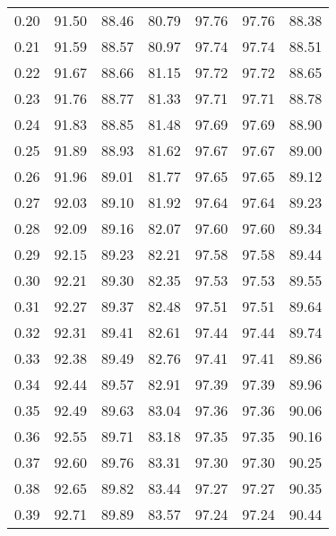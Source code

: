 \begin{tabular}{|c|c|c|c|c|c|c|}
      0.20 &     91.50 &     88.46 &      80.79 &   97.76 &      97.76 &         88.38 \\
      0.21 &     91.59 &     88.57 &      80.97 &   97.74 &      97.74 &         88.51 \\
      0.22 &     91.67 &     88.66 &      81.15 &   97.72 &      97.72 &         88.65 \\
      0.23 &     91.76 &     88.77 &      81.33 &   97.71 &      97.71 &         88.78 \\
      0.24 &     91.83 &     88.85 &      81.48 &   97.69 &      97.69 &         88.90 \\
      0.25 &     91.89 &     88.93 &      81.62 &   97.67 &      97.67 &         89.00 \\
      0.26 &     91.96 &     89.01 &      81.77 &   97.65 &      97.65 &         89.12 \\
      0.27 &     92.03 &     89.10 &      81.92 &   97.64 &      97.64 &         89.23 \\
      0.28 &     92.09 &     89.16 &      82.07 &   97.60 &      97.60 &         89.34 \\
      0.29 &     92.15 &     89.23 &      82.21 &   97.58 &      97.58 &         89.44 \\
      0.30 &     92.21 &     89.30 &      82.35 &   97.53 &      97.53 &         89.55 \\
      0.31 &     92.27 &     89.37 &      82.48 &   97.51 &      97.51 &         89.64 \\
      0.32 &     92.31 &     89.41 &      82.61 &   97.44 &      97.44 &         89.74 \\
      0.33 &     92.38 &     89.49 &      82.76 &   97.41 &      97.41 &         89.86 \\
      0.34 &     92.44 &     89.57 &      82.91 &   97.39 &      97.39 &         89.96 \\
      0.35 &     92.49 &     89.63 &      83.04 &   97.36 &      97.36 &         90.06 \\
      0.36 &     92.55 &     89.71 &      83.18 &   97.35 &      97.35 &         90.16 \\
      0.37 &     92.60 &     89.76 &      83.31 &   97.30 &      97.30 &         90.25 \\
      0.38 &     92.65 &     89.82 &      83.44 &   97.27 &      97.27 &         90.35 \\
      0.39 &     92.71 &     89.89 &      83.57 &   97.24 &      97.24 &         90.44 \\

\end{tabular}
